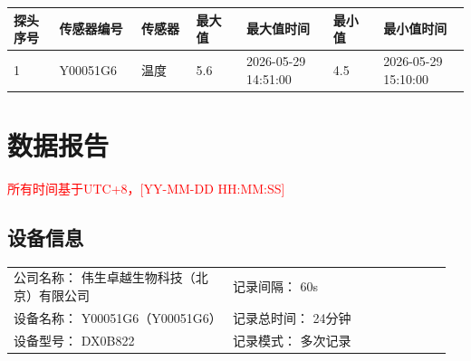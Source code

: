 \documentclass[UTF8,10pt,a4paper,fontset=fandol]{ctexart}
\newcommand{\fieldvalue}[1]{#1}
\begin{document}
\begin{center}
\small
\begin{tabular}{|p{0.10\linewidth}|p{0.18\linewidth}|p{0.12\linewidth}|p{0.11\linewidth}|p{0.19\linewidth}|p{0.11\linewidth}|p{0.19\linewidth}|}
\hline
探头序号 & 传感器编号 & 传感器 & 最大值 & 最大值时间 & 最小值 & 最小值时间 \\
\hline
\fieldvalue{1}
&
\fieldvalue{Y00051G6}
&
\fieldvalue{温度}
&
\fieldvalue{5.6}
&
\fieldvalue{2026-05-29 14:51:00}
&
\fieldvalue{4.5}
&
\fieldvalue{2026-05-29 15:10:00}
\\
\hline
\end{tabular}
\end{center}


\newpage

\section*{数据报告}

\textcolor{red}{所有时间基于UTC+8，[YY-MM-DD HH:MM:SS]}

\subsection*{设备信息}

\begin{tabular}{@{}p{0.48\linewidth}p{0.48\linewidth}@{}}
公司名称：
\fieldvalue{伟生卓越生物科技（北京）有限公司}
&
记录间隔：
\fieldvalue{60s}
\\
设备名称：
\fieldvalue{Y00051G6（Y00051G6）}
&
记录总时间：
\fieldvalue{24分钟}
\\
设备型号：
\fieldvalue{DX0B822}
&
记录模式：
\fieldvalue{多次记录}
\end{tabular}
\end{document}
